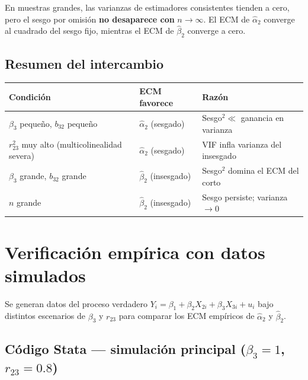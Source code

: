 \documentclass[12pt, letterpaper]{article}
\begin{document}
En muestras grandes, las varianzas de estimadores consistentes tienden a cero,
pero el sesgo por omisión \textbf{no desaparece con} $n\to\infty$. El ECM de
$\hat{\alpha}_2$ converge al cuadrado del sesgo fijo, mientras el ECM de
$\hat{\beta}_2$ converge a cero.

\subsection{Resumen del intercambio}

\begin{center}
\renewcommand{\arraystretch}{1.3}
\small
\begin{tabular}{p{5.2cm}p{3.4cm}p{4.2cm}}
\toprule
\textbf{Condición} & \textbf{ECM favorece} & \textbf{Razón} \\
\midrule
$\beta_3$ pequeño, $b_{32}$ pequeño
  & $\hat{\alpha}_2$ (sesgado)  & Sesgo$^2 \ll$ ganancia en varianza \\
$r_{23}^2$ muy alto (multicolinealidad severa)
  & $\hat{\alpha}_2$ (sesgado)  & VIF infla varianza del insesgado \\
$\beta_3$ grande, $b_{32}$ grande
  & $\hat{\beta}_2$ (insesgado) & Sesgo$^2$ domina el ECM del corto \\
$n$ grande
  & $\hat{\beta}_2$ (insesgado) & Sesgo persiste; varianza $\to 0$ \\
\bottomrule
\end{tabular}
\end{center}

\section{Verificación empírica con datos simulados}

Se generan datos del proceso verdadero $Y_i = \beta_1 + \beta_2 X_{2i}
+ \beta_3 X_{3i} + u_i$ bajo distintos escenarios de $\beta_3$ y $r_{23}$
para comparar los ECM empíricos de $\hat{\alpha}_2$ y $\hat{\beta}_2$.

\subsection{Código Stata --- simulación principal ($\beta_3 = 1$, $r_{23} = 0.8$)}
\end{document}
